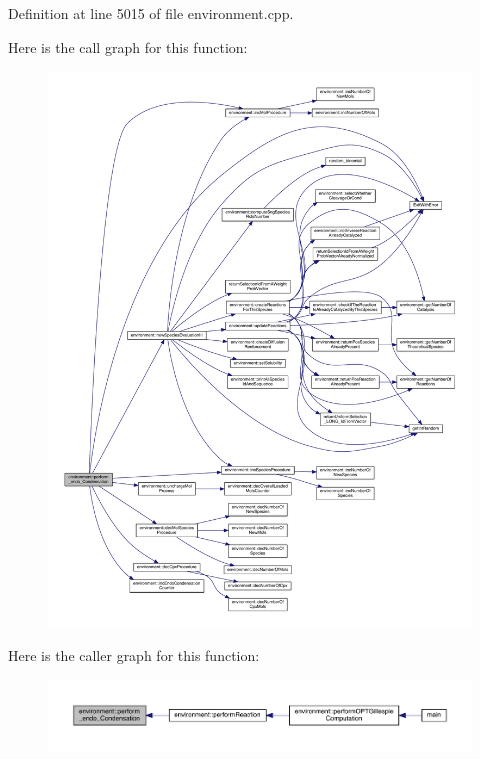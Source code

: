 Definition at line 5015 of file environment.\-cpp.



Here is the call graph for this function\-:\nopagebreak
\begin{figure}[H]
\begin{center}
\leavevmode
\includegraphics[width=350pt]{a00014_aa7a2cc95d8ba242c805a8fda063b23a7_cgraph}
\end{center}
\end{figure}




Here is the caller graph for this function\-:\nopagebreak
\begin{figure}[H]
\begin{center}
\leavevmode
\includegraphics[width=350pt]{a00014_aa7a2cc95d8ba242c805a8fda063b23a7_icgraph}
\end{center}
\end{figure}



